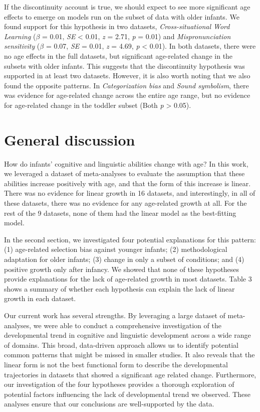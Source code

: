 \documentclass[
  man]{apa6}
\begin{document}
If the discontinuity account is true, we should expect to see more significant age effects to emerge on models run on the subset of data with older infants. We found support for this hypothesis in two datasets, \emph{Cross-situational Word Learning} (\(\beta\) = 0.01, \emph{SE} \textless{} 0.01, \emph{z} = 2.71, \emph{p} = 0.01) and \emph{Mispronunciation sensitivity} (\(\beta\) = 0.07, \emph{SE} = 0.01, \emph{z} = 4.69, \emph{p} \textless{} 0.01). In both datasets, there were no age effects in the full datasets, but significant age-related change in the subsets with older infants. This suggests that the discontinuity hypothesis was supported in at least two datasets. However, it is also worth noting that we also found the opposite patterns. In \emph{Categorization bias} and \emph{Sound symbolism}, there was evidence for age-related change across the entire age range, but no evidence for age-related change in the toddler subset (Both \emph{p} \textgreater{} 0.05).

\hypertarget{general-discussion}{%
\section{General discussion}\label{general-discussion}}

How do infants' cognitive and linguistic abilities change with age? In this work, we leveraged a dataset of meta-analyses to evaluate the assumption that these abilities increase positively with age, and that the form of this increase is linear. There was no evidence for linear growth in 16 datasets, and interestingly, in all of these datasets, there was no evidence for any age-related growth at all. For the rest of the 9 datasets, none of them had the linear model as the best-fitting model.

In the second section, we investigated four potential explanations for this pattern: (1) age-related selection bias against younger infants; (2) methodological adaptation for older infants; (3) change in only a subset of conditions; and (4) positive growth only after infancy. We showed that none of these hypotheses provide explanations for the lack of age-related growth in most datasets. Table 3 shows a summary of whether each hypothesis can explain the lack of linear growth in each dataset.

Our current work has several strengths. By leveraging a large dataset of meta-analyses, we were able to conduct a comprehensive investigation of the developmental trend in cognitive and linguistic development across a wide range of domains. This broad, data-driven approach allows us to identify potential common patterns that might be missed in smaller studies. It also reveals that the linear form is not the best functional form to describe the developmental trajectories in datasets that showed a significant age related change. Furthermore, our investigation of the four hypotheses provides a thorough exploration of potential factors influencing the lack of developmental trend we observed. These analyses ensure that our conclusions are well-supported by the data.
\end{document}
